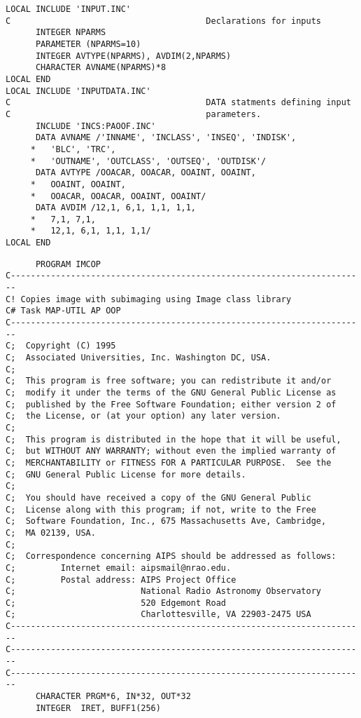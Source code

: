 {\small\begin{verbatim}
LOCAL INCLUDE 'INPUT.INC'
C                                       Declarations for inputs
      INTEGER NPARMS
      PARAMETER (NPARMS=10)
      INTEGER AVTYPE(NPARMS), AVDIM(2,NPARMS)
      CHARACTER AVNAME(NPARMS)*8
LOCAL END
LOCAL INCLUDE 'INPUTDATA.INC'
C                                       DATA statments defining input
C                                       parameters.
      INCLUDE 'INCS:PAOOF.INC'
      DATA AVNAME /'INNAME', 'INCLASS', 'INSEQ', 'INDISK',
     *   'BLC', 'TRC',
     *   'OUTNAME', 'OUTCLASS', 'OUTSEQ', 'OUTDISK'/
      DATA AVTYPE /OOACAR, OOACAR, OOAINT, OOAINT,
     *   OOAINT, OOAINT,
     *   OOACAR, OOACAR, OOAINT, OOAINT/
      DATA AVDIM /12,1, 6,1, 1,1, 1,1,
     *   7,1, 7,1,
     *   12,1, 6,1, 1,1, 1,1/
LOCAL END
\end{verbatim}
\begin{verbatim}
      PROGRAM IMCOP
C-----------------------------------------------------------------------
C! Copies image with subimaging using Image class library
C# Task MAP-UTIL AP OOP
C-----------------------------------------------------------------------
C;  Copyright (C) 1995
C;  Associated Universities, Inc. Washington DC, USA.
C;
C;  This program is free software; you can redistribute it and/or
C;  modify it under the terms of the GNU General Public License as
C;  published by the Free Software Foundation; either version 2 of
C;  the License, or (at your option) any later version.
C;
C;  This program is distributed in the hope that it will be useful,
C;  but WITHOUT ANY WARRANTY; without even the implied warranty of
C;  MERCHANTABILITY or FITNESS FOR A PARTICULAR PURPOSE.  See the
C;  GNU General Public License for more details.
C;
C;  You should have received a copy of the GNU General Public
C;  License along with this program; if not, write to the Free
C;  Software Foundation, Inc., 675 Massachusetts Ave, Cambridge,
C;  MA 02139, USA.
C;
C;  Correspondence concerning AIPS should be addressed as follows:
C;         Internet email: aipsmail@nrao.edu.
C;         Postal address: AIPS Project Office
C;                         National Radio Astronomy Observatory
C;                         520 Edgemont Road
C;                         Charlottesville, VA 22903-2475 USA
C-----------------------------------------------------------------------
C-----------------------------------------------------------------------
C-----------------------------------------------------------------------
      CHARACTER PRGM*6, IN*32, OUT*32
      INTEGER  IRET, BUFF1(256)

\end{verbatim}}
